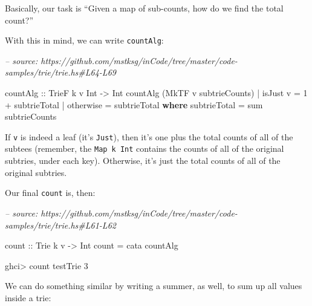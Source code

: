 \documentclass[]{article}
\newenvironment{Shaded}{}{}
\newcommand{\CommentTok}[1]{\textcolor[rgb]{0.38,0.63,0.69}{\textit{#1}}}
\newcommand{\DataTypeTok}[1]{\textcolor[rgb]{0.56,0.13,0.00}{#1}}
\newcommand{\DecValTok}[1]{\textcolor[rgb]{0.25,0.63,0.44}{#1}}
\newcommand{\FunctionTok}[1]{\textcolor[rgb]{0.02,0.16,0.49}{#1}}
\newcommand{\KeywordTok}[1]{\textcolor[rgb]{0.00,0.44,0.13}{\textbf{#1}}}
\newcommand{\NormalTok}[1]{#1}
\newcommand{\OtherTok}[1]{\textcolor[rgb]{0.00,0.44,0.13}{#1}}
\begin{document}
Basically, our task is ``Given a map of sub-counts, how do we find the total
count?''

With this in mind, we can write \texttt{countAlg}:

\begin{Shaded}
\begin{Highlighting}[]
\CommentTok{-- source: https://github.com/mstksg/inCode/tree/master/code-samples/trie/trie.hs#L64-L69}

\OtherTok{countAlg ::} \DataTypeTok{TrieF}\NormalTok{ k v }\DataTypeTok{Int} \OtherTok{->} \DataTypeTok{Int}
\NormalTok{countAlg (}\DataTypeTok{MkTF}\NormalTok{ v subtrieCounts)}
    \FunctionTok{|}\NormalTok{ isJust v  }\FunctionTok{=} \DecValTok{1} \FunctionTok{+}\NormalTok{ subtrieTotal}
    \FunctionTok{|}\NormalTok{ otherwise }\FunctionTok{=}\NormalTok{ subtrieTotal}
  \KeywordTok{where}
\NormalTok{    subtrieTotal }\FunctionTok{=}\NormalTok{ sum subtrieCounts}
\end{Highlighting}
\end{Shaded}

If \texttt{v} is indeed a leaf (it's \texttt{Just}), then it's one plus the
total counts of all of the subtees (remember, the \texttt{Map\ k\ Int} contains
the counts of all of the original subtries, under each key). Otherwise, it's
just the total counts of all of the original subtries.

Our final \texttt{count} is, then:

\begin{Shaded}
\begin{Highlighting}[]
\CommentTok{-- source: https://github.com/mstksg/inCode/tree/master/code-samples/trie/trie.hs#L61-L62}

\OtherTok{count ::} \DataTypeTok{Trie}\NormalTok{ k v }\OtherTok{->} \DataTypeTok{Int}
\NormalTok{count }\FunctionTok{=}\NormalTok{ cata countAlg}
\end{Highlighting}
\end{Shaded}

\begin{Shaded}
\begin{Highlighting}[]
\NormalTok{ghci}\FunctionTok{>}\NormalTok{ count testTrie}
\DecValTok{3}
\end{Highlighting}
\end{Shaded}

We can do something similar by writing a summer, as well, to sum up all values
inside a trie:
\end{document}
